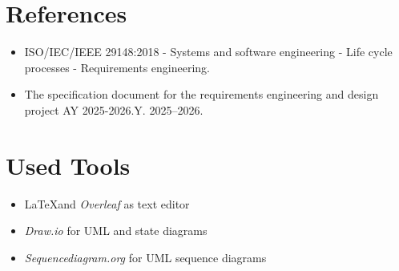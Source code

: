 \section{References}
\label{sec:references}%

\begin{itemize}
    \item ISO/IEC/IEEE 29148:2018 - Systems and software engineering - Life cycle processes - Requirements engineering.
    \item The specification document for the requirements engineering and design project AY 2025-2026.Y. 2025–2026. 
\end{itemize}

\section{Used Tools}
\label{sec:used_tools}%
\begin{itemize}
    \item \LaTeX and \textit{Overleaf} as text editor
    \item \textit{Draw.io} for UML and state diagrams
    \item \textit{Sequencediagram.org} for UML sequence diagrams
\end{itemize}